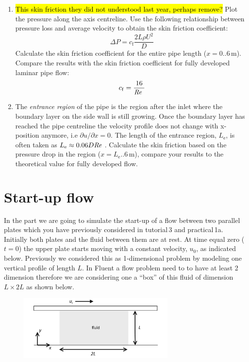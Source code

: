 \documentclass[11pt,a4paper,oneside,hidelinks]{scrartcl}
\newcommand\Rey{\mbox{\textit{Re}}\,\,}
\begin{document}
\begin{enumerate}
\item \hl{This skin friction they did not understood last year, perhaps remove?} Plot the pressure along the axis centreline. Use the following relationship between pressure loss and average velocity to obtain the skin friction coefficient:
\begin{equation}
    \Delta P=c_\mathrm{f}\frac{2L\rho U^2}{D}
\end{equation}
Calculate the skin friction coefficient for the entire pipe length ($x=0..6$\,m). Compare the results with the skin friction coefficient for fully developed laminar pipe flow:
\begin{equation}
    c_\mathrm{f}=\frac{16}{\Rey}
\end{equation}
\item The \emph{entrance region} of the pipe is the region after the inlet where the boundary layer on the side wall is still growing. Once the boundary layer has reached the pipe centreline the velocity profile does not change with x-position anymore, i.e  $\partial u/\partial x=0$. The length of the entrance region, $L_\mathrm{e}$, is often taken as $L_\mathrm{e}\approx0.06D\Rey$. Calculate the skin friction based on the pressure drop in the region ($x=L_\mathrm{e}..6$\,m), compare your results to the theoretical value for fully developed flow.
\end{enumerate}

\section{Start-up flow}

In the part we are going to simulate the start-up of a flow between two parallel plates which you have previously considered in tutorial\,3 and practical\,1a. Initially both plates and the fluid between them are at rest. At time equal zero ($t=0$) the upper plate starts moving with a constant velocity, $u_0$, as indicated below. Previously we considered this as 1-dimensional problem by modeling one vertical profile of length $L$. In Fluent a flow problem need to to have at least 2 dimension therefore we are considering one a ``box'' of this fluid of dimension $L\times 2L$ as shown below.

\begin{figure}[H]
\begin{center}
\includegraphics[width=0.7\textwidth,clip]{start_up_flow.png}
\end{center}
\end{figure}
\end{document}
